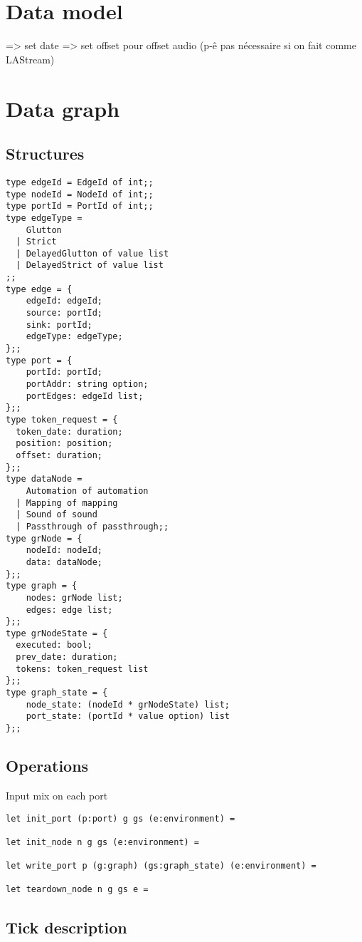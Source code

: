 \documentclass[applsci,article,submit,moreauthors,pdftex,10pt,a4paper]{mdpi}
\begin{document}
\section{Data model}\label{sec.datamodel}
=> set date
=> set offset pour offset audio (p-ê pas nécessaire si on fait comme LAStream)

\section{Data graph}

\subsection{Structures}
\begin{lstlisting}
type edgeId = EdgeId of int;;
type nodeId = NodeId of int;;
type portId = PortId of int;;
type edgeType =
    Glutton
  | Strict
  | DelayedGlutton of value list
  | DelayedStrict of value list
;;
type edge = {
    edgeId: edgeId;
    source: portId;
    sink: portId;
    edgeType: edgeType;
};;
type port = {
    portId: portId;
    portAddr: string option;
    portEdges: edgeId list;
};;
type token_request = {
  token_date: duration;
  position: position;
  offset: duration;
};;
type dataNode =
    Automation of automation
  | Mapping of mapping
  | Sound of sound
  | Passthrough of passthrough;;
type grNode = {
    nodeId: nodeId;
    data: dataNode;
};;
type graph = {
    nodes: grNode list;
    edges: edge list;
};;
type grNodeState = {
  executed: bool;
  prev_date: duration;
  tokens: token_request list
};;
type graph_state = {
    node_state: (nodeId * grNodeState) list;
    port_state: (portId * value option) list
};;
\end{lstlisting}


\subsection{Operations}
Input mix on each port

\begin{lstlisting}
let init_port (p:port) g gs (e:environment) =

let init_node n g gs (e:environment) =

let write_port p (g:graph) (gs:graph_state) (e:environment) =

let teardown_node n g gs e =
\end{lstlisting}



\subsection{Tick description}
\end{document}
